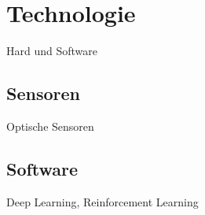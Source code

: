 \section{Technologie}

Hard und Software

\subsection{Sensoren}

Optische Sensoren


\subsection{Software}

Deep Learning, \cite{EasyChair:1305} Reinforcement Learning
